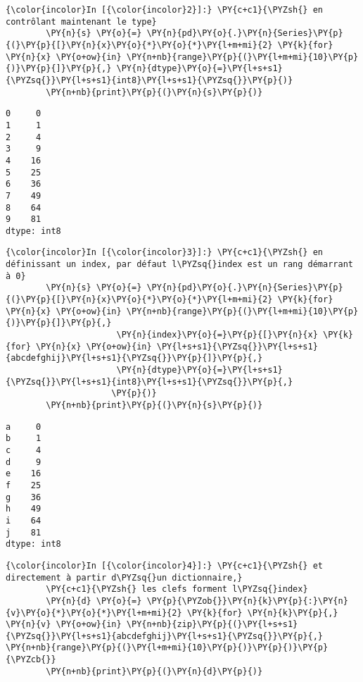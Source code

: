     \begin{Verbatim}[commandchars=\\\{\},frame=single,framerule=0.3mm,rulecolor=\color{cellframecolor}]
{\color{incolor}In [{\color{incolor}2}]:} \PY{c+c1}{\PYZsh{} en contrôlant maintenant le type}
        \PY{n}{s} \PY{o}{=} \PY{n}{pd}\PY{o}{.}\PY{n}{Series}\PY{p}{(}\PY{p}{[}\PY{n}{x}\PY{o}{*}\PY{o}{*}\PY{l+m+mi}{2} \PY{k}{for} \PY{n}{x} \PY{o+ow}{in} \PY{n+nb}{range}\PY{p}{(}\PY{l+m+mi}{10}\PY{p}{)}\PY{p}{]}\PY{p}{,} \PY{n}{dtype}\PY{o}{=}\PY{l+s+s1}{\PYZsq{}}\PY{l+s+s1}{int8}\PY{l+s+s1}{\PYZsq{}}\PY{p}{)}
        \PY{n+nb}{print}\PY{p}{(}\PY{n}{s}\PY{p}{)}
\end{Verbatim}


    \begin{Verbatim}[commandchars=\\\{\},frame=single,framerule=0.3mm,rulecolor=\color{cellframecolor}]
0     0
1     1
2     4
3     9
4    16
5    25
6    36
7    49
8    64
9    81
dtype: int8
\end{Verbatim}

    \begin{Verbatim}[commandchars=\\\{\},frame=single,framerule=0.3mm,rulecolor=\color{cellframecolor}]
{\color{incolor}In [{\color{incolor}3}]:} \PY{c+c1}{\PYZsh{} en définissant un index, par défaut l\PYZsq{}index est un rang démarrant à 0}
        \PY{n}{s} \PY{o}{=} \PY{n}{pd}\PY{o}{.}\PY{n}{Series}\PY{p}{(}\PY{p}{[}\PY{n}{x}\PY{o}{*}\PY{o}{*}\PY{l+m+mi}{2} \PY{k}{for} \PY{n}{x} \PY{o+ow}{in} \PY{n+nb}{range}\PY{p}{(}\PY{l+m+mi}{10}\PY{p}{)}\PY{p}{]}\PY{p}{,}
                      \PY{n}{index}\PY{o}{=}\PY{p}{[}\PY{n}{x} \PY{k}{for} \PY{n}{x} \PY{o+ow}{in} \PY{l+s+s1}{\PYZsq{}}\PY{l+s+s1}{abcdefghij}\PY{l+s+s1}{\PYZsq{}}\PY{p}{]}\PY{p}{,}
                      \PY{n}{dtype}\PY{o}{=}\PY{l+s+s1}{\PYZsq{}}\PY{l+s+s1}{int8}\PY{l+s+s1}{\PYZsq{}}\PY{p}{,}
                     \PY{p}{)}
        \PY{n+nb}{print}\PY{p}{(}\PY{n}{s}\PY{p}{)}
\end{Verbatim}


    \begin{Verbatim}[commandchars=\\\{\},frame=single,framerule=0.3mm,rulecolor=\color{cellframecolor}]
a     0
b     1
c     4
d     9
e    16
f    25
g    36
h    49
i    64
j    81
dtype: int8
\end{Verbatim}

    \begin{Verbatim}[commandchars=\\\{\},frame=single,framerule=0.3mm,rulecolor=\color{cellframecolor}]
{\color{incolor}In [{\color{incolor}4}]:} \PY{c+c1}{\PYZsh{} et directement à partir d\PYZsq{}un dictionnaire,}
        \PY{c+c1}{\PYZsh{} les clefs forment l\PYZsq{}index}
        \PY{n}{d} \PY{o}{=} \PY{p}{\PYZob{}}\PY{n}{k}\PY{p}{:}\PY{n}{v}\PY{o}{*}\PY{o}{*}\PY{l+m+mi}{2} \PY{k}{for} \PY{n}{k}\PY{p}{,} \PY{n}{v} \PY{o+ow}{in} \PY{n+nb}{zip}\PY{p}{(}\PY{l+s+s1}{\PYZsq{}}\PY{l+s+s1}{abcdefghij}\PY{l+s+s1}{\PYZsq{}}\PY{p}{,} \PY{n+nb}{range}\PY{p}{(}\PY{l+m+mi}{10}\PY{p}{)}\PY{p}{)}\PY{p}{\PYZcb{}}
        \PY{n+nb}{print}\PY{p}{(}\PY{n}{d}\PY{p}{)}
\end{Verbatim}


